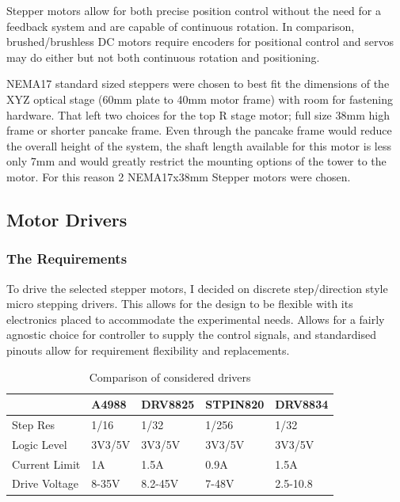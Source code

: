 Stepper motors allow for both precise position control without the need for a feedback system and are capable of continuous rotation. In comparison, brushed/brushless DC motors require encoders for positional control and servos may do either but not both continuous rotation and positioning.

NEMA17 standard sized steppers were chosen to best fit the dimensions of the XYZ optical stage (60mm plate to 40mm motor frame) with room for fastening hardware. That left two choices for the top R stage motor; full size 38mm high frame or shorter pancake frame. Even through the pancake frame would reduce the overall height of the system, the shaft length available for this motor is less only 7mm and would greatly restrict the mounting options of the tower to the motor. For this reason 2 NEMA17x38mm Stepper motors were chosen. 

\newpage
\subsection{Motor Drivers}

\subsubsection*{The Requirements}
To drive the selected stepper motors, I decided on discrete step/direction style micro stepping drivers. This allows for the design to be flexible with its electronics placed to accommodate the experimental needs. Allows for a fairly agnostic choice for controller to supply the control signals, and standardised pinouts allow for requirement flexibility and replacements.

\begin{table}[h]
    \centering
    \begin{tabular}{|l|l|l|l|l|}
    \hline
    \textbf{}     & \textbf{A4988} & \textbf{DRV8825} & \textbf{STPIN820} & \textbf{DRV8834} \\ \hline
    Step Res      & 1/16           & 1/32             & 1/256             & 1/32             \\ \hline
    Logic Level   & 3V3/5V         & 3V3/5V           & 3V3/5V            & 3V3/5V           \\ \hline
    Current Limit & 1A             & 1.5A             & 0.9A              & 1.5A             \\ \hline
    Drive Voltage & 8-35V          & 8.2-45V          & 7-48V             & 2.5-10.8         \\ \hline
    \end{tabular}
    \caption{Comparison of considered drivers}
    \end{table}

